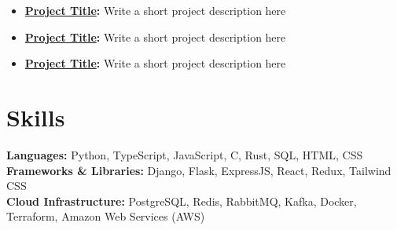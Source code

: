 \documentclass[letterpaper,11pt]{article}
\newcommand*{\ProjectItem}[3]{
  \item \textbf{\href{#2}{#1}:} {#3}
}
\begin{document}
\begin{itemize}
  \ProjectItem
    {Project Title}                             %
    {https://kennyzqng.com}                     %
    {Write a short project description here}    %

  \ProjectItem
    {Project Title}
    {https://mitcommlab.mit.edu/meche/commkit/portfolio/}
    {Write a short project description here}

  \ProjectItem
    {Project Title}
    {https://github.com/matiassingers/awesome-readme}
    {Write a short project description here}
\end{itemize}

\vspace{-18.5pt}


\section*{Skills}

\textbf{Languages:} Python, TypeScript, JavaScript, C, Rust, SQL, HTML, CSS \\
\textbf{Frameworks \& Libraries:} Django, Flask, ExpressJS, React, Redux, Tailwind CSS \\
\textbf{Cloud Infrastructure:} PostgreSQL, Redis, RabbitMQ, Kafka,
  Docker, Terraform, Amazon Web Services (AWS) 

\end{document}
